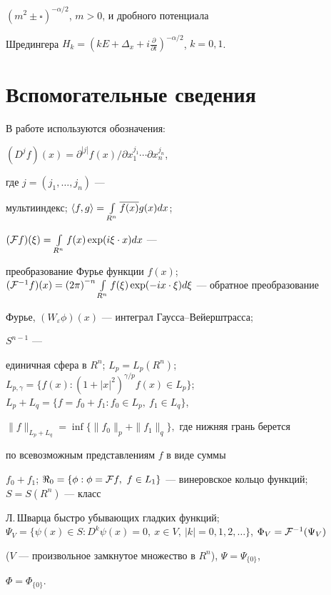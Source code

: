 ${(m^2\pm \square)}^{-\alpha/2}$, $m > 0$, и дробного потенциала


Шредингера $H_k = {(kE + {\Delta}_x + i \frac{\partial}{\partial t})}^{-


\alpha/2}$, $k = 0,1$.








\section{Вспомогательные сведения}





В работе используются обозначения:


$(D^jf)(x)=\partial^{|j|}f(x)/\partial x_1^{j_1}\dotsb\partial x_n^{j_n}$,


где $j=(j_1,\dotsc,j_n)$ ---


мультииндекс; $\langle f,g\rangle =\int\limits_{R^n}\overline{f(x)}g(x)dx$;


$({\cal F} f)(\xi)=\int\limits_{R^n} f(x)\exp(i\xi\cdot x)dx$ ---


преобразование Фурье функции $f(x)$; $(\F^{-1}f)(x)=


{(2\pi)}^{-n}\Intr f(\xi)\exp(-ix\cdot\xi)d\xi$ --- обратное преобразование


Фурье, $(W_{\varepsilon}\phi)(x)$ --- интеграл Гаусса--Вейерштрасса;


$S^{n-1}$ ---


единичная сфера в $R^n$; $L_p=L_p(R^n)$; $L_{p,\gamma}=\{f(x):{(1+{|x|}^2)}^


{\gamma/p}f(x)\in L_p\}$; $L_p+L_q=\{f=f_0+f_1: f_0\in L_p,\ f_1\in L_q\}$,


$\|f\|_{L_p+L_q}=\inf \{\|f_0\|_p+\|f_1\|_q\},$ где нижняя грань берется


по всевозможным представлениям $f$ в виде суммы


$f_0+f_1$; ${\Re}_0=\{\phi:\phi=


\F f,\ f\in L_1\}$ --- винеровское кольцо функций; $S = S(R^n)$ --- класс


Л.\,Шварца быстро убывающих гладких функций; $\Psi_V=\{\psi(x)\in S:


D^k\psi(x)=0,\ x\in V,\ |k|=0,1,2,\dotsc\}$, $\Phi_V=\F^{-1}(\Psi_V)$


($V$ --- произвольное замкнутое множество в $R^n$), $\Psi=\Psi_{\{0\}}$,


$\Phi=\Phi_{\{0\}}$.








